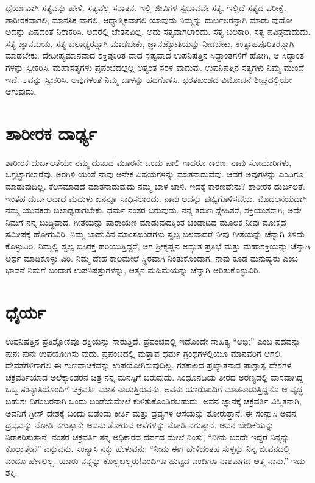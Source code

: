 ಧೈರ್ಯವಾಗಿ ಸತ್ಯವನ್ನು ಹೇಳಿ. ಸತ್ಯವೆಲ್ಲ ಸನಾತನ. ಇಲ್ಲಿ ಜೀವಿಗಳ ಸ್ವಭಾವವೇ ಸತ್ಯ. ಇಲ್ಲಿದೆ ಸತ್ಯದ ಪರೀಕ್ಷೆ. ಶಾರೀರಕವಾಗಲಿ, ಮಾನಸಿಕ ವಾಗಲಿ, ಆಧ್ಯಾತ್ಮಿಕವಾಗಲಿ ಯಾವುದು ನಿಮ್ಮನ್ನು ದುರ್ಬಲರನ್ನಾಗಿ ಮಾಡು ವುದೋ ಅದನ್ನು ವಿಷದಂತೆ ನಿರಾಕರಿಸಿ. ಅದರಲ್ಲಿ ಚೇತನವಿಲ್ಲ. ಅದು ಸತ್ಯವಾಗಲಾರದು. ಸತ್ಯ ಬಲಕಾರಿ, ಸತ್ಯ ಪವಿತ್ರವಾದುದು. ಸತ್ಯ ಜ್ಞಾನಮಯ. ಸತ್ಯ ಬಲಾಢ್ಯರನ್ನಾಗಿ ಮಾಡಬೇಕು, ಜ್ಞಾನಜ್ಯೋತಿಯನ್ನು ನೀಡಬೇಕು, ಉತ್ಸಾಹಪೂರಿತರನ್ನಾಗಿ ಮಾಡಬೇಕು. ದೇದೀಪ್ಯಮಾನವಾದ ಶಕ್ತಿಪೂರಿತ ವಾದ ಸ್ಪಷ್ಟವಾದ ಉಪನಿಷತ್ತಿನ ಸಿದ್ಧಾಂತಗಳಿಗೆ ಹೋಗಿ, ಆ ಸಿದ್ಧಾಂತ ಗಳನ್ನು ಸ್ವೀಕರಿಸಿ. ಮಹಾಸತ್ಯಗಳು ಪ್ರಪಂಚದಲ್ಲೆಲ್ಲ ಅತ್ಯಂತ ಸರಳ ವಾದುವು. ಉಪನಿಷತ್ತಿನ ಸತ್ಯಗಳು ನಿಮ್ಮ ಮುಂದೆ ಇವೆ. ಅವನ್ನು ಸ್ವೀಕರಿಸಿ. ಅವುಗಳಂತೆ ನಿಮ್ಮ ಬಾಳನ್ನು ಹದಗೊಳಿಸಿ. ಭರತಖಂಡದ ವಿಮೋಚನೆ ಶೀಘ್ರದಲ್ಲಿಯೇ ಆಗುವುದು.


\section{ಶಾರೀರಕ ದಾರ್ಢ್ಯ}

ಶಾರೀರಕ ದುರ್ಬಲತೆಯೇ ನಮ್ಮ ದುಃಖದ ಮೂರನೇ ಒಂದು ಪಾಲಿ ಗಾದರೂ ಕಾರಣ. ನಾವು ಸೋಮಾರಿಗಳು, ಒಗ್ಗಟ್ಟಾಗಲಾರೆವು. ಅರಗಿಳಿ ಯಂತೆ ನಾವು ಅನೇಕ ವಿಷಯಗಳನ್ನು ಮಾತನಾಡುವೆವು. ಆದರೆ ಅವುಗಳನ್ನು ಎಂದಿಗೂ ಮಾಡುವುದಿಲ್ಲ. ಕೆಲಸಮಾಡದೆ ಮಾತನಾಡುವುದು ನಮ್ಮ ಬಾಳ ಚಾಳಿ. ಇದಕ್ಕೆ ಕಾರಣವೇನು? ಶಾರೀರಕ ದುರ್ಬಲತೆ. ಇಂತಹ ದುರ್ಬಲವಾದ ಮೆದುಳು ಏನನ್ನೂ ಸಾಧಿಸಲಾರದು. ನಾವು ಅದನ್ನು ಪುಷ್ಟಿಗೊಳಿಸಬೇಕು. ಮೊದಲನೆಯದಾಗಿ ನಮ್ಮ ಯುವಕರು ಬಲಾಢ್ಯರಾಗಬೇಕು. ಧರ್ಮ ನಂತರ ಬರುವುದು. ನನ್ನ ತರುಣ ಸ್ನೇಹಿತರೆ, ಶಕ್ತಿಯುತರಾಗಿ; ಅದೇ ನಿಮಗೆ ನನ್ನ ಬುದ್ಧಿವಾದ. ಗೀತೆಯನ್ನು ಪಾರಾಯಣ ಮಾಡುವುದಕ್ಕಿಂತ ಚಂಡಾಟದ ಮೂಲಕ ನೀವು ಮೋಕ್ಷದ ಸಮೀಪಕ್ಕೆ ಹೋಗುವಿರಿ. ನಿಮ್ಮ ಬಾಹುವಿನ ಮಾಂಸಖಂಡಗಳು ಸ್ವಲ್ಪ ಬಲವಾದರೆ ನೀವು ಗೀತೆಯನ್ನು ಚೆನ್ನಾಗಿ ತಿಳಿದು ಕೊಳ್ಳುವಿರಿ. ನಿಮ್ಮಲ್ಲಿ ಸ್ವಲ್ಪ ಬಿಸಿರಕ್ತ ಹರಿಯುತ್ತಿದ್ದರೆ, ಆಗ ಶ್ರೀಕೃಷ್ಣನ ಅದ್ಭುತ ಪ್ರತಿಭೆ ಮತ್ತು ಮಹಾಶಕ್ತಿಯನ್ನು ಚೆನ್ನಾಗಿ ಅರ್ಥ ಮಾಡಿಕೊಳ್ಳು ವಿರಿ. ನಿಮ್ಮ ದೇಹ ಕಾಲಮೇಲೆ ಸ್ಥಿರವಾಗಿ ನಿಂತುಕೊಂಡಾಗ, ನಾವು ಕೂಡ ಮನುಷ್ಯರು ಎಂಬ ಭಾವನೆ ನಿಮಗೆ ಬಂದಾಗ ಉಪನಿಷತ್ತುಗಳನ್ನು, ಆತ್ಮನ ಮಹಿಮೆಯನ್ನು ಚೆನ್ನಾಗಿ ಅರಿತುಕೊಳ್ಳುವಿರಿ.


\section{ಧೈರ್ಯ}

ಉಪನಿಷತ್ತಿನ ಪ್ರತಿಶ್ಲೋಕವೂ ಶಕ್ತಿಯನ್ನು ಸಾರುತ್ತಿದೆ. ಪ್ರಪಂಚದಲ್ಲಿ ಇದೊಂದೇ ಸಾಹಿತ್ಯ “ಅಭಿಃ” ಎಂಬ ಪದವನ್ನು ಪುನಃ ಪುನಃ ಉಪಯೋಗಿಸು ವುದು. ಪ್ರಪಂಚದಲ್ಲಿ ಮತ್ತಾವ ಧರ್ಮ ಗ್ರಂಥಗಳಲ್ಲಿಯೂ ಮಾನವರಿಗೆ ಆಗಲಿ, ದೇವತೆಗಳಿಗಾಗಲಿ ಈ ಗುಣವಾಚಕವನ್ನು ಉಪಯೋಗಿಸುವುದಿಲ್ಲ. ಗತಕಾಲದ ಪ್ರಖ್ಯಾತನಾದ ಪಾಶ್ಚಾತ್ಯ ದೇಶಗಳ ಚಕ್ರವರ್ತಿಯಾದ ಅಲೆಕ್ಸಾಂಡರನ ಚಿತ್ರ ನನ್ನ ಮನಸ್ಸಿಗೆ ಬರುವುದು. ಸಿಂಧೂನದಿಯ ತೀರದ ಅರಣ್ಯದಲ್ಲಿ ವಾಸವಾಗಿದ್ದ ಒಬ್ಬ ಸಂನ್ಯಾಸಿಯೊಂದಿಗೆ ಚಕ್ರವರ್ತಿ ಮಾತ ನಾಡುತ್ತಿರುವನು. ಅವನು ಯಾರೊಂದಿಗೆ ಮಾತನಾಡುತ್ತಿದ್ದನೊ ಆ ವೃದ್ಧ ಬಹುಶಃ ದಿಗಂಬರನಾಗಿ ಒಂದು ಬಂಡೆಯಮೇಲೆ ಕುಳಿತುಕೊಂಡಿರಬಹುದು. ಅವನ ಜ್ಞಾನಕ್ಕೆ ಚಕ್ರವರ್ತಿ ವಿಸ್ಮಿತನಾಗಿ, ಅವನಿಗೆ ಗ್ರೀಸ್ ದೇಶಕ್ಕೆ ಬಂದು ಬಿಡೆಂದು ಕೀರ್ತಿ ಮತ್ತು ದ್ರವ್ಯಗಳ ಆಸೆಯನ್ನು ತೋರುತ್ತಾನೆ. ಈ ಸಂನ್ಯಾಸಿ ಅವನ ದ್ರವ್ಯವನ್ನು ನೋಡಿ ನಗುತ್ತಾನೆ; ಅವನು ತೋರುವ ಆಸೆಗಳನ್ನು ನೋಡಿ ನಗುತ್ತಾನೆ. ಅವನ ಬೇಡಿಕೆಯನ್ನು ನಿರಾಕರಿಸುತ್ತಾನೆ. ನಂತರ ಚಕ್ರವರ್ತಿ ತನ್ನ ಅಧಿಕಾರದ ದರ್ಪದ ಮೇಲೆ ನಿಂತು, “ನೀನು ಬರದೇ ಇದ್ದರೆ ನಿನ್ನನ್ನು ಕೊಲ್ಲುತ್ತೇನೆ” ಎನ್ನುವನು. ಸಂನ್ಯಾಸಿ ನಕ್ಕು ಹೇಳುವನು: “ನೀನು ಈಗ ಹೇಳಿದಂತಹ ಸುಳ್ಳನ್ನು ನಿನ್ನ ಜೀವನದಲ್ಲಿ ಎಂದೂ ಹೇಳಲಿಲ್ಲ. ಯಾರು ನನ್ನನ್ನು ಕೊಲ್ಲಬಲ್ಲರು!ಎಂದಿಗೂ ಹುಟ್ಟದ ಎಂದಿಗೂ ನಾಶವಾಗದ ಆತ್ಮ ನಾನು.” ಇದು ಶಕ್ತಿ.


